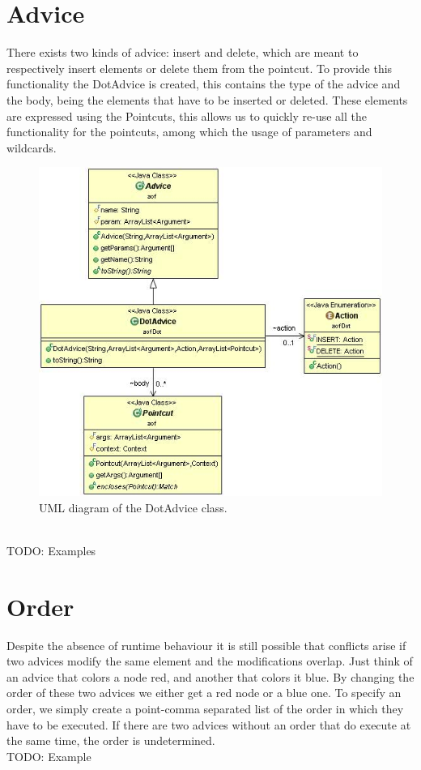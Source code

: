 \documentclass[a4paper]{report}
\begin{document}
\section{Advice}
There exists two kinds of advice: insert and delete, which are meant to respectively insert elements or delete them from the pointcut. To provide this functionality the DotAdvice is created, this contains the type of the advice and the body, being the elements that have to be inserted or deleted. These elements are expressed using the Pointcuts, this allows us to quickly re-use all the functionality for the pointcuts, among which the usage of parameters and wildcards.\\
\begin{figure}
\centering
\includegraphics[scale=0.6]{images/AOFDot/DotAdvice.jpg}
\caption{UML diagram of the DotAdvice class.}
\label{fig:DotAdvice}
\end{figure}
\\
TODO: Examples

\section{Order}
Despite the absence of runtime behaviour it is still possible that conflicts arise if two advices modify the same element and the modifications overlap. Just think of an advice that colors a node red, and another that colors it blue. By changing the order of these two advices we either get a red node or a blue one. To specify an order, we simply create a point-comma separated list of the order in which they have to be executed. If there are two advices without an order that do execute at the same time, the order is undetermined.\\
TODO: Example
\end{document}
